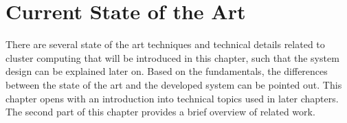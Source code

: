 \chapter{Current State of the Art}
\label{sec:state}






There are several state of the art techniques and technical details
related to cluster computing that will be introduced in this chapter,
such that the system design can be explained later on. Based on the
fundamentals, the differences between the state of the art and the
developed system can be pointed out.  This chapter opens with an
introduction into technical topics used in later chapters. The second
part of this chapter provides a brief overview of related work.


